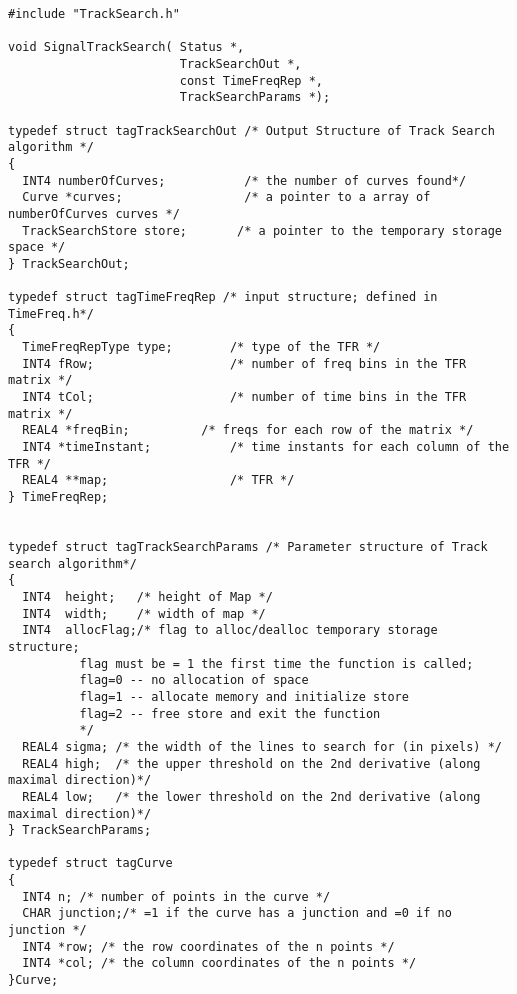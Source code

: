 \begin{verbatim}
#include "TrackSearch.h"

void SignalTrackSearch( Status *,
                        TrackSearchOut *,
                        const TimeFreqRep *,
                        TrackSearchParams *);

typedef struct tagTrackSearchOut /* Output Structure of Track Search algorithm */
{
  INT4 numberOfCurves;           /* the number of curves found*/
  Curve *curves;                 /* a pointer to a array of numberOfCurves curves */
  TrackSearchStore store;       /* a pointer to the temporary storage space */
} TrackSearchOut;

typedef struct tagTimeFreqRep /* input structure; defined in TimeFreq.h*/
{
  TimeFreqRepType type;        /* type of the TFR */
  INT4 fRow;                   /* number of freq bins in the TFR matrix */
  INT4 tCol;                   /* number of time bins in the TFR matrix */
  REAL4 *freqBin;	       /* freqs for each row of the matrix */
  INT4 *timeInstant;           /* time instants for each column of the TFR */
  REAL4 **map;                 /* TFR */
} TimeFreqRep;


typedef struct tagTrackSearchParams /* Parameter structure of Track search algorithm*/
{  
  INT4  height;   /* height of Map */
  INT4  width;    /* width of map */
  INT4  allocFlag;/* flag to alloc/dealloc temporary storage structure;
		  flag must be = 1 the first time the function is called; 
		  flag=0 -- no allocation of space
		  flag=1 -- allocate memory and initialize store
		  flag=2 -- free store and exit the function 
		  */
  REAL4 sigma; /* the width of the lines to search for (in pixels) */
  REAL4 high;  /* the upper threshold on the 2nd derivative (along maximal direction)*/
  REAL4 low;   /* the lower threshold on the 2nd derivative (along maximal direction)*/
} TrackSearchParams;

typedef struct tagCurve
{
  INT4 n; /* number of points in the curve */
  CHAR junction;/* =1 if the curve has a junction and =0 if no junction */ 
  INT4 *row; /* the row coordinates of the n points */
  INT4 *col; /* the column coordinates of the n points */
}Curve;



\end{verbatim}
